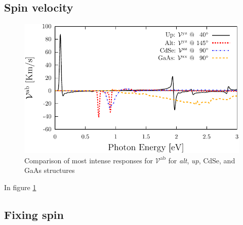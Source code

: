 \documentclass[prb,11pt,tightenlines,twocolumn,aps]{revtex4-1}
\begin{document}


\subsection{Spin velocity} %
\label{sec:res-pure_spin_current_and_spin_velocity}


\begin{figure}[t]
    \centering
    \includegraphics[width=\linewidth]{plots/vab-str-comp}
    \caption{Comparison of most intense responses for
    $\mathcal{V}^{\mathrm{ab}}$ for \emph{alt}, \emph{up}, CdSe, and GaAs
    structures}
    \label{fig:vab-str-comp}
\end{figure}

In figure \ref{fig:vab-str-comp}




\subsection{Fixing spin} %
\label{sec:res-fixspin}

\end{document}
